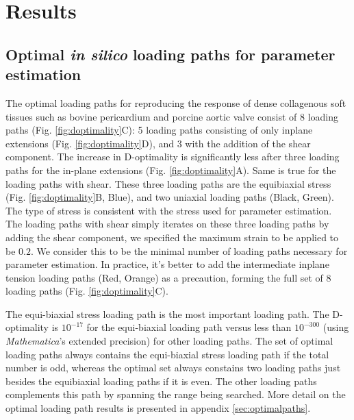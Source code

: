 \section{Results}


\subsection{Optimal \textit{in silico} loading paths for parameter estimation}

	The optimal loading paths for reproducing the response of dense collagenous soft tissues such as bovine pericardium and porcine aortic valve consist of 8 loading paths (Fig. \ref{fig:doptimality}C): 5 loading paths consisting of only inplane extensions (Fig. \ref{fig:doptimality}D), and 3 with the addition of the shear component. The increase in D-optimality is significantly less after three loading paths for the in-plane extensions (Fig. \ref{fig:doptimality}A). Same is true for the loading paths with shear. These three loading paths are the equibiaxial stress (Fig. \ref{fig:doptimality}B, Blue), and two uniaxial loading paths (Black, Green). The type of stress is consistent with the stress used for parameter estimation. The loading paths with shear simply iterates on these three loading paths by adding the shear component, we specified the maximum strain to be applied to be $0.2$. We consider this to be the minimal number of loading paths necessary for parameter estimation. In practice, it's better to add the intermediate inplane tension loading paths (Red, Orange) as a precaution, forming the full set of 8 loading paths (Fig. \ref{fig:doptimality}C). 
	
	
	The equi-biaxial stress loading path is the most important loading path. The D-optimality is $10^{-17}$ for the equi-biaxial loading path versus less than $10^{-300}$ (using \textit{Mathematica}'s extended precision) for other loading paths. The set of optimal loading paths always contains the equi-biaxial stress loading path if the total number is odd, whereas the optimal set always constains two loading paths just besides the equibiaxial loading paths if it is even. The other loading paths complements this path by spanning the range being searched. More detail on the optimal loading path results is presented in appendix \ref{sec:optimalpaths}.
	
